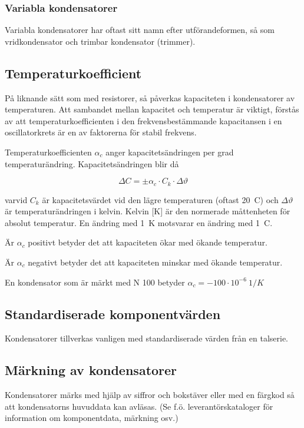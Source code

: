 \subsubsection{Variabla kondensatorer}
Variabla kondensatorer har oftast sitt namn efter utförandeformen, så som
vridkondensator och trimbar kondensator (trimmer).

\subsection{Temperaturkoefficient}

På liknande sätt som med resistorer, så påverkas kapaciteten i kondensatorer av
temperaturen. Att sambandet mellan kapacitet och temperatur är viktigt, förstås
av att temperaturkoefficienten i den frekvensbestämmande kapacitansen i en
oscillatorkrets är en av faktorerna för stabil frekvens.

Temperaturkoefficienten \(\alpha _c\) anger kapacitetsändringen per grad temperaturändring.
Kapacitetsändringen blir då

\[\Delta C = \pm \alpha _c \cdot C_k \cdot \Delta\vartheta\]

varvid \(C_k\) är kapacitetsvärdet vid den lägre temperaturen (oftast 20~\degree C) och
\(\Delta\vartheta\) är temperaturändringen i kelvin.
Kelvin [K] är den normerade måttenheten för absolut temperatur.
En ändring med 1~K motsvarar en ändring med 1~\degree C.

Är \(\alpha _c\) positivt betyder det att kapaciteten ökar med ökande
temperatur.

Är \(\alpha _c\) negativt betyder det att kapaciteten minskar med ökande
temperatur.

En kondensator som är märkt med N 100 betyder
\(\alpha _c = -100 \cdot 10^{-6}\ 1/K\)

\subsection{Standardiserade komponentvärden}

Kondensatorer tillverkas vanligen med standardiserade värden från en talserie.

\subsection{Märkning av kondensatorer}

Kondensatorer märks med hjälp av siffror och bokstäver eller med en färgkod så att
kondensatorns huvuddata kan avläsas.
(Se f.ö. leverantörskataloger för information om komponentdata, märkning osv.)
